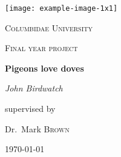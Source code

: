 {
  \centering
  \texttt{[image: example-image-1x1]}\par\vspace{1cm}
  {\scshape\LARGE Columbidae University \par}
  \vspace{1cm}
  {\scshape\Large Final year project\par}
  \vspace{1.5cm}
  {\huge\bfseries Pigeons love doves\par}
  \vspace{2cm}
  {\Large\itshape John Birdwatch\par}
  \vfill
  supervised by\par
  Dr.~Mark \textsc{Brown}

  \vfill

  {\large \today\par}
}

\cleardoublepage
\setcounter{page}{1}